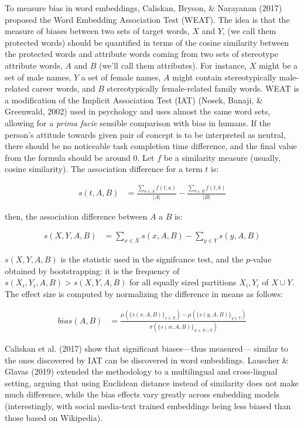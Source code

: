\documentclass[10pt,dvipsnames,enabledeprecatedfontcommands]{scrartcl}
\begin{document}
To measure bias in word embeddings, Caliskan, Bryson, \& Narayanan
(2017) proposed the Word Embedding Association Test (WEAT). The idea is
that the measure of biases between two sets of target words, \(X\) and
\(Y\), (we call them protected words) should be quantified in terms of
the cosine similarity between the protected words and attribute words
coming from two sets of stereotype attribute words, \(A\) and \(B\)
(we'll call them attributes). For instance, \(X\) might be a set of male
names, \(Y\) a set of female names, \(A\) might contain stereotypically
male-related career words, and \(B\) stereotypically female-related
family words. WEAT is a modification of the Implicit Association Test
(IAT) (Nosek, Banaji, \& Greenwald, 2002) used in psychology and uses
almost the same word sets, allowing for a \emph{prima facie} sensible
comparison with bias in humans. If the person's attitude towards given
pair of concept is to be interpreted as neutral, there should be no
noticeable task completion time difference, and the final value from the
formula should be around 0. Let \(f\) be a similarity measure (usually,
cosine similarity). The association difference for a term \(t\) is:

\begin{align}
s(t,A,B) & = \frac{\sum_{a\in A}f(t,a)}{\vert A\vert} - \frac{\sum_{b\in B}f(t,b)}{\vert B\vert}
\end{align}

\noindent then, the association difference between \(A\) a \(B\) is:

\begin{align}
s(X,Y,A,B) & = \sum_{x\in X} s(x,A,B) -  \sum_{y\in Y} s(y,A,B)
\end{align}

\noindent
\(s(X,Y,A,B)\) is the statistic used in the signifcance test, and the
\(p\)-value obtained by bootstrapping: it is the frequency of
\(s(X_i,Y_i,A,B)>s(X,Y,A,B)\) for all equally sized partitions
\(X_i, Y_i\) of \(X\cup Y\). The effect size is computed by normalizing
the difference in means as follows:

\begin{align}
bias(A,B) & = \frac{
\mu(\{s(x,A,B)\}_{x\in X}) -\mu(\{s(y,A,B)\}_{y\in Y}) 
}{
\sigma(\{s(w,A,B)\}_{w\in X\cup Y})
}
\end{align}

Caliskan et al. (2017) show that significant biases---thus measured---
similar to the ones discovered by IAT can be discovered in word
embeddings. Lauscher \& Glavas (2019) extended the methodology to a
multilingual and cross-lingual setting, arguing that using Euclidean
distance instead of similarity does not make much difference, while the
bias effects vary greatly across embedding models (interestingly, with
social media-text trained embeddings being less biased than those based
on Wikipedia).
\end{document}
